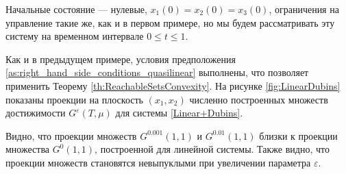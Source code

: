 \documentclass[../main.tex]{subfiles}
\begin{document}
\begin{pr}
    Начальные состояние --- нулевые, $x_1(0) = x_2(0) = x_3(0) $, ограничения на управление такие же, как и в первом примере, но мы будем рассматривать эту систему на временном интервале $0 \leqslant t \leqslant 1$.
    
    Как и в предыдущем примере, условия предположения \ref{as:right_hand_side_conditions_quasilinear} выполнены, что позволяет применить Теорему \ref{th:ReachableSetsConvexity}. 
    На рисунке \ref{fig:LinearDubins} показаны проекции на плоскость $(x_1,x_2)$ численно построенных множеств достижимости $G^{\varepsilon}(T,\mu)$ для системы \eqref{Linear+Dubins}. 
    
    Видно, что проекции множеств $G^{0.001}(1,1) $ и $G^{0.01}(1,1) $ близки к проекции множества $G^{0}(1,1) $, построенной для линейной системы. 
    Также видно, что проекции множеств становятся невыпуклыми при увеличении параметра $\varepsilon$. 
\end{pr}  %
\end{document}
